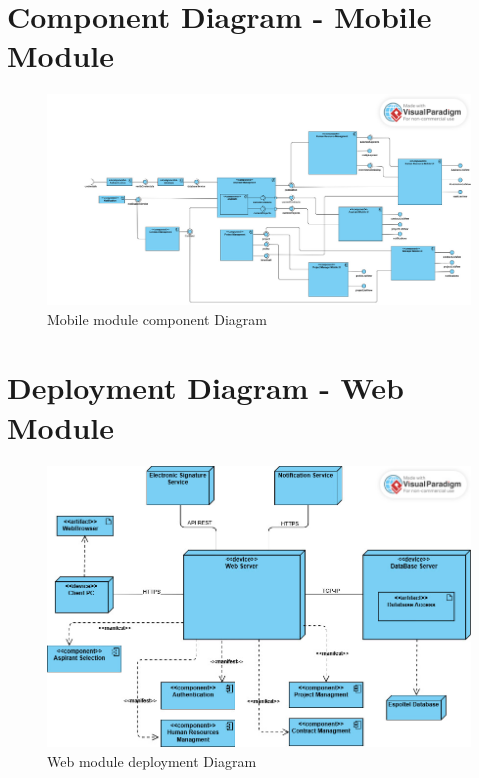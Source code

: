 \documentclass{scrreprt}
\begin{document}
\section{Component Diagram - Mobile Module}
\begin{figure}[H]
	\centering  \small
	\includegraphics[width=\textwidth]{DCP/DCP2.jpeg} 
	\caption{Mobile module component Diagram}
	\label{fig:DCP2}
\end{figure}

\section{Deployment Diagram - Web Module}
\begin{figure}[H]
	\centering  \small
	\includegraphics[width=\textwidth]{DPL/DPL1.jpeg} 
	\caption{Web module deployment Diagram}
	\label{fig:DPL1}
\end{figure}
\end{document}
